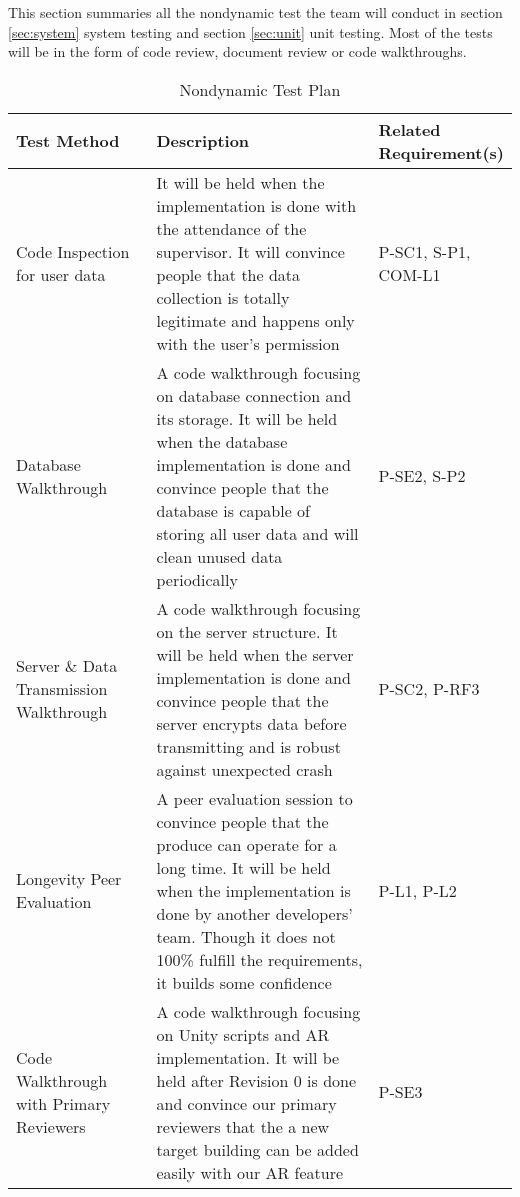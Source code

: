 \documentclass[12pt, titlepage]{article}
\begin{document}
This section summaries all the nondynamic test the team will conduct in section \ref{sec:system} system testing and section \ref{sec:unit} unit testing. Most of the tests will be in the form of code review,  document review or code walkthroughs.
\begin{table}[H]
\caption{Nondynamic Test Plan}
\begin{tabular}{|p{0.3\linewidth} | p{0.5\linewidth}| p{0.2\linewidth} |}
\hline
\multicolumn{1}{|l}{\bfseries Test Method} & \multicolumn{1}{|l|}{\bfseries Description} & \multicolumn{1}{l|}{\bfseries Related Requirement(s)}\\
\hline
Code Inspection for user data & It will be held when the implementation is done with the attendance of the supervisor. It will convince people that the data collection is totally legitimate and happens only with the user's permission & P-SC1, S-P1, COM-L1 \\
\hline
Database Walkthrough & A code walkthrough focusing on database connection and its storage. It will be held when the database implementation is done and convince people that the database is capable of storing all user data and will clean unused data periodically & P-SE2, S-P2\\
\hline
Server \& Data Transmission Walkthrough & A code walkthrough focusing on the server structure. It will be held when the server implementation is done and convince people that the server encrypts data before transmitting and is robust against unexpected crash & P-SC2, P-RF3 \\
\hline
Longevity Peer Evaluation & A peer evaluation session to convince people that the produce can operate for a long time. It will be held when the implementation is done by another developers' team. Though it does not 100\% fulfill the requirements, it builds some confidence & P-L1, P-L2\\
\hline
Code Walkthrough with Primary Reviewers & A code walkthrough focusing on Unity scripts and AR implementation. It will be held after Revision 0 is done and convince our primary reviewers that the a new target building can be added easily with our AR feature & P-SE3\\
\hline
\end{tabular}
\end{table}
\end{document}

